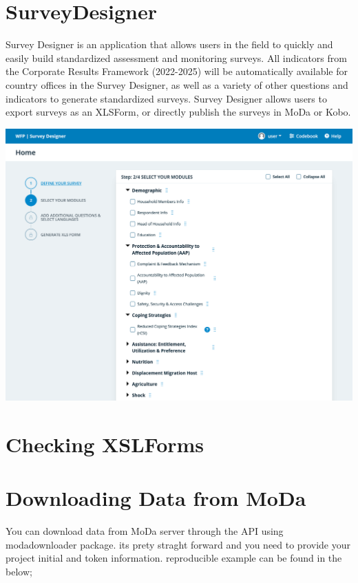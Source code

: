 \documentclass[
  letterpaper,
  DIV=11,
  numbers=noendperiod]{scrreprt}
\begin{document}
\hypertarget{surveydesigner}{%
\section{SurveyDesigner}\label{surveydesigner}}

Survey Designer is an application that allows users in the field to
quickly and easily build standardized assessment and monitoring surveys.
All indicators from the Corporate Results Framework (2022-2025) will be
automatically available for country offices in the Survey Designer, as
well as a variety of other questions and indicators to generate
standardized surveys. Survey Designer allows users to export surveys as
an XLSForm, or directly publish the surveys in MoDa or Kobo.

\includegraphics[width=1\textwidth,height=\textheight]{assets/SurveyDesigner.png}

\hypertarget{checking-xslforms}{%
\section{Checking XSLForms}\label{checking-xslforms}}

\hypertarget{downloading-data-from-moda}{%
\section{Downloading Data from MoDa}\label{downloading-data-from-moda}}

You can download data from MoDa server through the API using
modadownloader package. its prety straght forward and you need to
provide your project initial and token information. reproducible example
can be found in the below;
\end{document}
